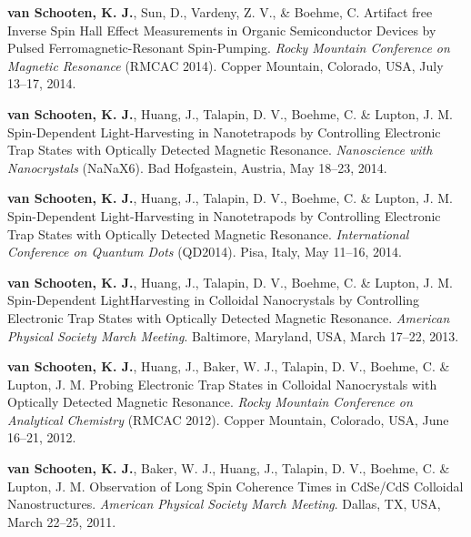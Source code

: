 \documentclass[11pt,letterpaper]{article}
\newcommand{\mhead}[1]{\leavevmode\marginpar{\sffamily\small #1}}
\begin{document}
\bigskip
\mhead{Conference\newline Talks}
\vspace{-1.0em} %
\begin{bibenum}

		\item \textbf{van Schooten, K. J.}, Sun, D., Vardeny, Z. V., \& Boehme, C. Artifact free Inverse Spin Hall Effect Measurements in Organic Semiconductor Devices by Pulsed Ferromagnetic-Resonant Spin-Pumping. \textit{Rocky Mountain Conference on Magnetic Resonance} (RMCAC 2014). Copper Mountain, Colorado, USA, July 13--17, 2014.

		\item \textbf{van Schooten, K. J.}, Huang, J., Talapin, D. V., Boehme, C. \& Lupton, J. M. Spin-Dependent Light-Harvesting in Nanotetrapods by Controlling Electronic Trap States with Optically Detected Magnetic Resonance. \textit{Nanoscience with Nanocrystals} (NaNaX6). Bad Hofgastein, Austria, May 18--23, 2014.
		
		\item \textbf{van Schooten, K. J.}, Huang, J., Talapin, D. V., Boehme, C. \& Lupton, J. M. Spin-Dependent Light-Harvesting in Nanotetrapods by Controlling Electronic Trap States with Optically Detected Magnetic Resonance. \textit{International Conference on Quantum Dots} (QD2014). Pisa, Italy, May 11--16, 2014.
		
		\item \textbf{van Schooten, K. J.}, Huang, J., Talapin, D. V., Boehme, C. \& Lupton, J. M. Spin-Dependent LightHarvesting in Colloidal Nanocrystals by Controlling Electronic Trap States with Optically Detected Magnetic Resonance. \textit{American Physical Society March Meeting}. Baltimore, Maryland, USA, March 17--22, 2013.
		
		\item \textbf{van Schooten, K. J.}, Huang, J., Baker, W. J., Talapin, D. V., Boehme, C. \& Lupton, J. M. Probing Electronic Trap States in Colloidal Nanocrystals with Optically Detected Magnetic Resonance. \textit{Rocky Mountain Conference on Analytical Chemistry} (RMCAC 2012). Copper Mountain, Colorado, USA, June 16--21, 2012.
		
		\item \textbf{van Schooten, K. J.}, Baker, W. J., Huang, J., Talapin, D. V., Boehme, C. \& Lupton, J. M. Observation of Long Spin Coherence Times in CdSe/CdS Colloidal Nanostructures. \textit{American Physical Society March Meeting}. Dallas, TX, USA, March 22--25, 2011.

\end{bibenum}
\end{document}
